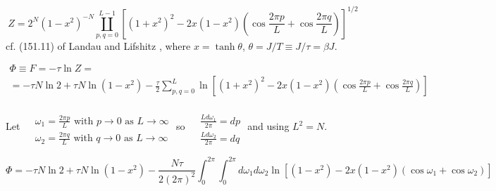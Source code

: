 \begin{equation}\label{agat:Eq:2dIsingZexact}
Z = 2^N(1-x^2)^{-N} \coprod_{p,q=0}^{L-1} \left[ (1+x^2)^2 - 2x(1-x^2) \left( \cos{ \frac{2\pi p}{L} } + \cos{ \frac{2\pi q }{L} } \right) \right]^{1/2} 
\end{equation}
cf. (151.11) of Landau and Lifshitz \cite{agat:LaLi1980}, where $x= \tanh{\theta}$, $\theta = J/T \equiv J/\tau = \beta J$.  

\begin{equation}
\begin{gathered}
\Phi \equiv F = -\tau \ln{Z} = \\
= -\tau N \ln{2} + \tau N \ln{ (1-x^2)} - \frac{\tau}{2} \sum_{p,q=0}^L \ln{ \left[ (1+x^2)^2 - 2x(1-x^2) \left( \cos{ \frac{2\pi p}{L} } + \cos{ \frac{2\pi q }{L} } \right) \right] }
\end{gathered}
\end{equation}

Let $\begin{aligned}& \quad \\ 
& \omega_1 = \frac{2\pi p }{ L } \text{ with } p\to 0 \text{ as } L \to \infty \\ 
& \omega_2 = \frac{2\pi q }{ L } \text{ with } q\to 0 \text{ as } L \to \infty \end{aligned}$ so $\begin{aligned} & \quad \\ 
& \frac{ L d\omega_1 }{2\pi } = dp \\ 
& \frac{ L d\omega_2}{ 2\pi } = dq \end{aligned}$ and using $L^2 = N$.  


\[
\Phi = -\tau N \ln{2} + \tau N \ln{ (1-x^2)} - \frac{N\tau }{ 2(2\pi)^2 } \int_0^{2\pi } \int_0^{2\pi } d\omega_1 d\omega_2 \ln{ \left[ (1-x^2) -  2x(1-x^2) \left( \cos{  \omega_1 } + \cos{  \omega_2 } \right) \right]  }
\] 

